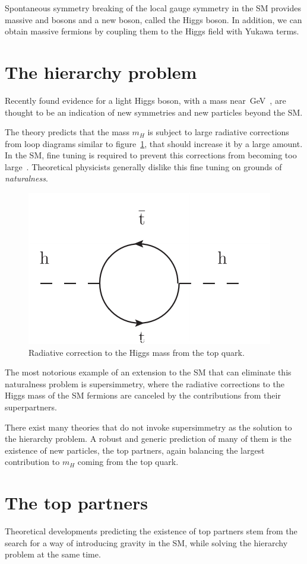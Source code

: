 Spontaneous symmetry breaking of the local gauge symmetry in the SM provides massive
\W and \Z bosons and a new boson, called the Higgs boson.
In addition, we can obtain massive fermions by coupling them to the Higgs
field with Yukawa terms.

\section{The hierarchy problem}
Recently found evidence for a light Higgs boson, with a mass
near~\unit[125]{GeV}~\cite{higgs.atlas,higgs.cms}, are thought to be an indication of new symmetries and
new particles beyond the SM.

The theory predicts that the mass $m_H$ is subject to large radiative
corrections from loop diagrams similar to figure~\ref{fig:higgs_correction},
that should increase it by a large amount.
In the SM, fine tuning is required to prevent this corrections from becoming
too large~\cite{hierarchy}. Theoretical physicists generally dislike this fine tuning on grounds of
\emph{naturalness}.

\begin{figure}[htb]
    \centering
    \includegraphics[width=.4\textwidth]{images/pdf/higgs_correction}
    \caption{Radiative correction to the Higgs mass from the top quark.}
    \label{fig:higgs_correction}
\end{figure}

The most notorious example of an extension to the SM that can eliminate this
naturalness problem is supersimmetry, where the radiative corrections to
the Higgs mass of the SM fermions are canceled by the contributions from
their superpartners.

There exist many theories that do not invoke supersimmetry as the solution
to the hierarchy problem. A robust and generic prediction of many of them is the
existence of new particles, the top partners, again balancing the
largest contribution to $m_H$ coming from the top quark.

\section{The top partners}\label{sec:top_partner_theory}
Theoretical developments predicting the existence of top partners stem from
the search for a way of introducing gravity in the SM, while solving the
hierarchy problem at the same time.

